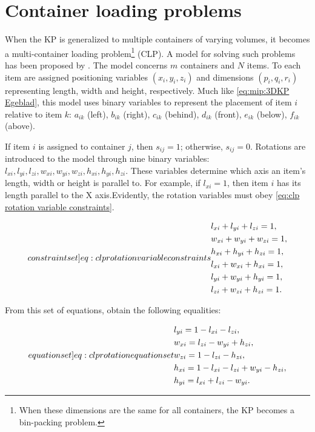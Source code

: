 \section{Container loading problems}

When the KP is generalized to multiple containers of varying volumes, it becomes a multi-container loading problem\footnote{When these dimensions are the same for all containers, the KP becomes a bin-packing problem.} (CLP). A model for solving such problems has been proposed by \textcite{CHEN1995}. The model concerns $m$ containers and $N$ items. To each item are assigned positioning variables $(x_i, y_i, z_i)$ and dimensions $(p_i, q_i, r_i)$ representing length, width and height, respectively. Much like \cref{eq:mip:3DKP Egeblad}, this model uses binary variables to represent the placement of item $i$ relative to item $k$: $a_{ik}$ (left), $b_{ik}$ (right), $c_{ik}$ (behind), $d_{ik}$ (front), $e_{ik}$ (below), $f_{ik}$ (above).

If item $i$ is assigned to container $j$, then $s_{ij} = 1$; otherwise, $s_{ij} = 0$. Rotations are introduced to the model through nine binary variables: $l_{xi}, l_{yi}, l_{zi}, w_{xi}, w_{yi}, w_{zi}, h_{xi}, h_{yi}, h_{zi}$. These variables determine which axis an item's length, width or height is parallel to. For example, if $l_{xi} = 1$, then item $i$ has its length parallel to the X axis.Evidently, the rotation variables must obey \cref{eq:clp rotation variable constraints}.

\begin{subequations}
    \label[constraint set]{eq:clp rotation variable constraints}
    \begin{align}
        &l_{xi} + l_{yi} + l_{zi} = 1,\\
        &w_{xi} + w_{yi} + w_{zi} = 1,\\
        &h_{xi} + h_{yi} + h_{zi} = 1,\\
        &l_{xi} + w_{xi} + h_{xi} = 1,\\
        &l_{yi} + w_{yi} + h_{yi} = 1,\\
        &l_{zi} + w_{zi} + h_{zi} = 1.
    \end{align}
\end{subequations}

From this set of equations, \textcite{CHEN1995} obtain the following equalities:

\begin{subequations}
    \label[equation set]{eq:clp rotation equation set}
    \begin{align}
        &l_{yi} = 1 - l_{xi} - l_{zi},\\
        &w_{xi} = l_{zi} - w_{yi} + h_{zi},\\
        &w_{zi} = 1 - l_{zi} - h_{zi},\\
        &h_{xi} = 1 - l_{xi} - l_{zi} + w_{yi} - h_{zi},\\
        &h_{yi} = l_{xi} + l_{zi} - w_{yi}.
    \end{align}
\end{subequations}

